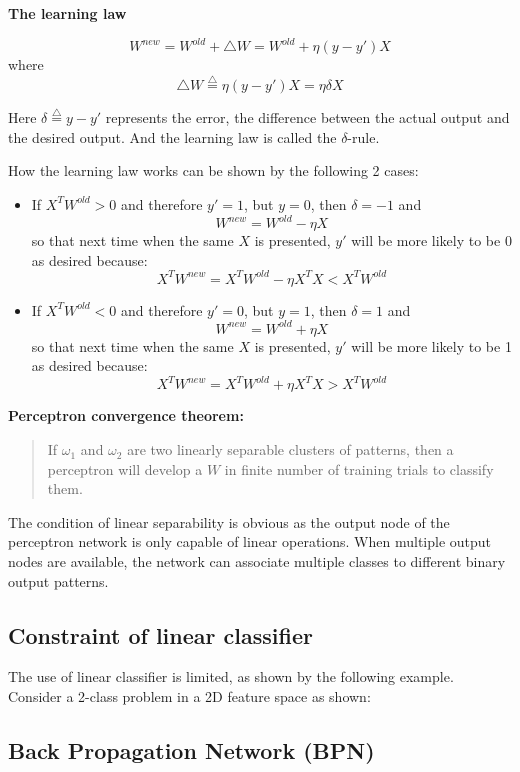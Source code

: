 {\bf The learning law}

\[	W^{new}=W^{old}+\triangle W=W^{old}+\eta (y-y')X	\]
where
\[	\triangle W\stackrel{\triangle}{=}\eta(y-y')X=\eta \delta X	\]

Here $\delta\stackrel{\triangle}{=}y-y'$ represents the error, the difference 
between the actual output and the desired output. And the learning law is 
called the $\delta$-rule.

\newpage
How the learning law works can be shown by the following 2 cases:
\begin{itemize}
\item If $X^TW^{old}>0$ and therefore $y'=1$, but $y=0$, then $\delta=-1$ and
	\[ W^{new}=W^{old}-\eta X	\]
	so that next time when the same $X$ is presented, $y'$ will be more 
	likely to be 0 as desired because:
	\[	X^TW^{new}=X^TW^{old}-\eta X^TX < X^TW^{old}	\]
\item If $X^TW^{old}<0$ and therefore $y'=0$, but $y=1$, then $\delta=1$ and
	\[ W^{new}=W^{old}+\eta X	\]
	so that next time when the same $X$ is presented, $y'$ will be more 
	likely to be 1 as desired because:
	\[	X^TW^{new}=X^TW^{old}+\eta X^TX > X^TW^{old}	\]
\end{itemize}

{\bf Perceptron convergence theorem:}

\begin{quote}
	If $\omega_1$ and $\omega_2$ are two linearly separable clusters of
	patterns, then a perceptron will develop a $W$ in finite number of 
	training trials to classify them.
\end{quote}

The condition of linear separability is obvious as the output node of the
perceptron network is only capable of linear operations. When multiple output
nodes are available, the network can associate multiple classes to different
binary output patterns.


\newpage
\subsection*{Constraint of linear classifier}

The use of linear classifier is limited, as shown by the following 
example. Consider a 2-class problem in a 2D feature space as shown:


\newpage
\subsection*{Back Propagation Network (BPN)}

